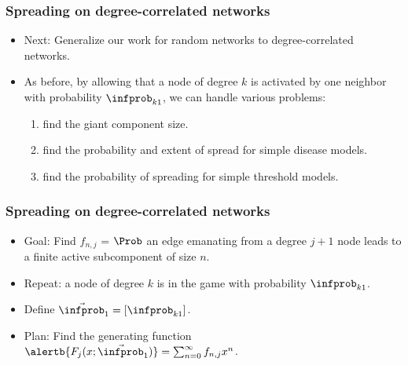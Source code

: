\begin{frame}
  \frametitle{Spreading on degree-correlated networks}

  \begin{itemize}
  \item<1-> 
    Next: Generalize our work for random networks to
    degree-correlated networks.
  \item<2-> 
    As before, by allowing that a node of degree $k$
    is activated by one neighbor with probability
    $\infprob_{k1}$, we can handle various problems:
    \begin{enumerate}
    \item<3-> 
      find the giant component size.
    \item<4-> 
      find the probability and extent of spread
      for simple disease models.
    \item<5-> 
      find the probability of spreading
      for simple threshold models.
    \end{enumerate}
    
  \end{itemize}

\end{frame}

\begin{frame}
  \frametitle{Spreading on degree-correlated networks}

  \begin{itemize}
  \item<1-> 
    \alert{Goal:} Find $f_{n,j}$ = $\Prob$ an edge 
    emanating from a degree $j+1$ node leads to
    a finite active subcomponent of size $n$.
  \item<2->
    Repeat: a node of degree $k$ is in the game with
    probability $\infprob_{k1}$.
  \item<3->
    Define $\vec{\infprob}_1 = [\infprob_{k1}]$.
  \item<4->
    \alert{Plan:} Find the generating function
    $\alertb{F_j(x;\vec{\infprob}_1)} = \sum_{n=0}^\infty f_{n,j} x^n$.
  \end{itemize}

\end{frame}

